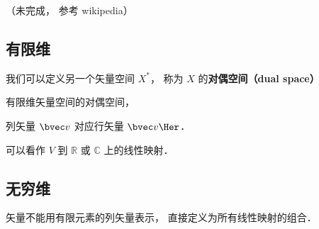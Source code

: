 
（未完成， 参考 wikipedia）

\subsection{有限维}
我们可以定义另一个矢量空间 $X^*$， 称为 $X$ 的\textbf{对偶空间（dual space）}

有限维矢量空间的对偶空间， 

列矢量 $\bvec v$ 对应行矢量 $\bvec v\Her$．

可以看作 $V$ 到 $\mathbb R$ 或 $\mathbb C$ 上的线性映射．

\subsection{无穷维}
矢量不能用有限元素的列矢量表示， 直接定义为所有线性映射的组合．
